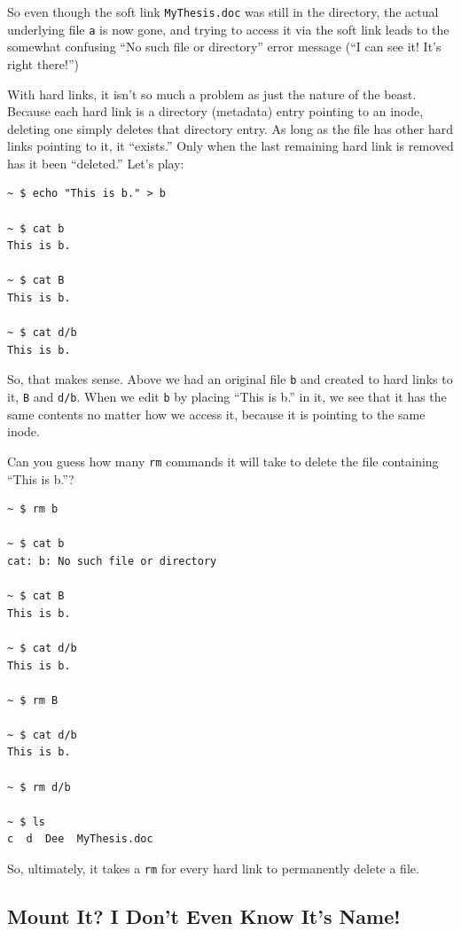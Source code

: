 \documentclass[10pt,]{book}
\numberwithin{figure}{chapter}
\begin{document}
So even though the soft link \texttt{MyThesis.doc} was still in the
directory, the actual underlying file \texttt{a} is now gone, and trying
to access it via the soft link leads to the somewhat confusing ``No such
file or directory'' error message (``I can see it! It's right there!'')

With hard links, it isn't so much a problem as just the nature of the
beast. Because each hard link is a directory (metadata) entry pointing
to an inode, deleting one simply deletes that directory entry. As long
as the file has other hard links pointing to it, it ``exists.'' Only
when the last remaining hard link is removed has it been ``deleted.''
Let's play:

\begin{verbatim}
~ $ echo "This is b." > b

~ $ cat b
This is b.

~ $ cat B
This is b.

~ $ cat d/b
This is b.
\end{verbatim}

So, that makes sense. Above we had an original file \texttt{b} and
created to hard links to it, \texttt{B} and \texttt{d/b}. When we edit
\texttt{b} by placing ``This is b.'' in it, we see that it has the same
contents no matter how we access it, because it is pointing to the same
inode.

Can you guess how many \texttt{rm} commands it will take to delete the
file containing ``This is b.''?

\begin{verbatim}
~ $ rm b

~ $ cat b
cat: b: No such file or directory

~ $ cat B
This is b.

~ $ cat d/b
This is b.

~ $ rm B

~ $ cat d/b
This is b.

~ $ rm d/b

~ $ ls
c  d  Dee  MyThesis.doc
\end{verbatim}

So, ultimately, it takes a \texttt{rm} for every hard link to
permanently delete a file.

\subsection{Mount It? I Don't Even Know It's
Name!}\label{mount-it-i-dont-even-know-its-name}
\end{document}

